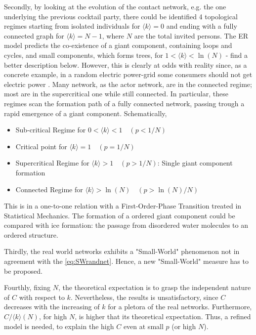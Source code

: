 \documentclass[a4paper,12pt,twoside]{book} %
\theoremstyle{definition}
\begin{document}
Secondly, by looking at the evolution of the contact network, e.g. the one underlying the previous cocktail party, there could be identified 4 topological regimes starting from isolated individuals for $\langle k \rangle = 0$ and ending with a fully connected graph for $\langle k \rangle = N-1$, where $N$ are the total invited persons. The ER model predicts the co-existence of a giant component, containing loops and cycles, and small components, which forms trees, for $1 < \langle k\rangle < \ln(N)$ - find a better description below. However, this is clearly at odds with reality since, as a concrete example, in a random electric power-grid some consumers should not get electric power \cite{barabasi::2016networkbook}. Many network, as the actor network, are in the connected regime; most are in the supercritical one while still connected.
In particular, these regimes scan the formation path of a fully connected network, passing trough a rapid emergence of a giant component.
\newline Schematically,
\begin{itemize}[noitemsep]
	\item Sub-critical Regime for $0 < \langle k \rangle < 1 \quad (p < 1/N)$ 
	\item Critical point for $\langle k \rangle = 1 \quad (p = 1/N)$
	\item Supercritical Regime for $\langle k \rangle > 1 \quad (p > 1/N)$: Single giant component formation
	\item Connected Regime for $\langle k \rangle > \ln(N) \quad (p > \ln(N)/N)$
\end{itemize}
This is in a one-to-one relation with a First-Order-Phase Transition treated in Statistical Mechanics. The formation of a ordered giant component could be compared with ice formation: the passage from disordered water molecules to an ordered structure.

Thirdly, the real world networks exhibits a "Small-World" phenomenon not in agreement with the \autoref{eq:SWrandnet}. Hence, a new "Small-World" measure has to be proposed.

Fourthly, fixing $N$, the theoretical expectation is to grasp the independent nature of $C$ with respect to $k$. Nevertheless, the results is unsatisfactory, since $C$ decreases with the increasing of $k$ for a pletora of the real networks.
Furthermore, $C/\langle k \rangle (N)$, for high $N$, is higher that its theoretical expectation. Thus, a refined model is needed, to explain the high $C$ even at small $p$ (or high $N$).
\end{document}

